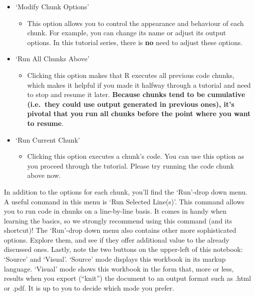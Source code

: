 \documentclass[
]{article}
\providecommand{\tightlist}{%
  \setlength{\itemsep}{0pt}\setlength{\parskip}{0pt}}
\begin{document}
\begin{itemize}
\tightlist
\item
  `Modify Chunk Options'

  \begin{itemize}
  \tightlist
  \item
    This option allows you to control the appearance and behaviour of
    each chunk. For example, you can change its name or adjust its
    output options. In this tutorial series, there is \textbf{no} need
    to adjust these options.
  \end{itemize}
\item
  `Run All Chunks Above'

  \begin{itemize}
  \tightlist
  \item
    Clicking this option makes that R executes all previous code chunks,
    which makes it helpful if you made it halfway through a tutorial and
    need to stop and resume it later. \textbf{Because chunks tend to be
    cumulative (i.e.~they could use output generated in previous ones),
    it's pivotal that you run all chunks before the point where you want
    to resume}.
  \end{itemize}
\item
  `Run Current Chunk'

  \begin{itemize}
  \tightlist
  \item
    Clicking this option executes a chunk's code. You can use this
    option as you proceed through the tutorial. Please try running the
    code chunk above now.
  \end{itemize}
\end{itemize}

In addition to the options for each chunk, you'll find the `Run'-drop
down menu. A useful command in this menu is `Run Selected Line(s)'. This
command allows you to run code in chunks on a line-by-line basis. It
comes in handy when learning the basics, so we strongly recommend using
this command (and its shortcut)! The `Run'-drop down menu also contains
other more sophisticated options. Explore them, and see if they offer
additional value to the already discussed ones. Lastly, note the two
buttons on the upper-left of this notebook: `Source' and `Visual'.
`Source' mode displays this workbook in its markup language. `Visual'
mode shows this workbook in the form that, more or less, results when
you export (``knit'') the document to an output format such as .html or
.pdf. It is up to you to decide which mode you prefer.
\end{document}
